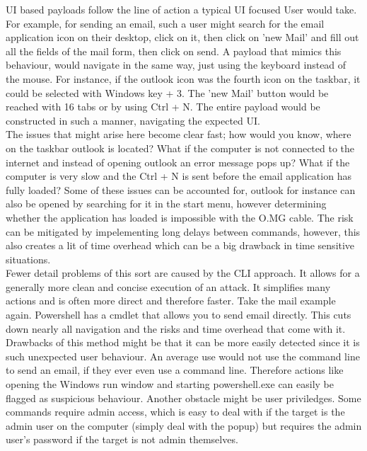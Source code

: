 UI based payloads follow the line of action a typical UI focused User would take. For example, for sending an email, such a user might search for the email application icon on their desktop, click on it, then click on 'new Mail' and fill out all the fields of the mail form, then click on send. A payload that mimics this behaviour, would navigate in the same way, just using the keyboard instead of the mouse. For instance, if the outlook icon was the fourth icon on the taskbar, it could be selected with Windows key + 3. The 'new Mail' button would be reached with 16 tabs or by using  Ctrl + N. The entire payload would be constructed in such a manner, navigating the expected UI. \\
The issues that might arise here become clear fast; how would you know, where on the taskbar outlook is located? What if the computer is not connected to the internet and instead of opening outlook an error message pops up? What if the computer is very slow and the Ctrl + N is sent before the email application has fully loaded?  Some of these issues can be accounted for, outlook for instance can also be opened by searching for it in the start menu, however determining whether the application has loaded is impossible with the O.MG cable. The risk can be mitigated by impelementing long delays between commands, however, this also creates a lit of time overhead which can be a big drawback in time sensitive situations. \\

Fewer detail problems of this sort are caused by the CLI approach. It allows for a generally more clean and concise execution of an attack. It simplifies many actions and is often more direct and therefore faster. Take the mail example again. Powershell has a cmdlet that allows you to send email directly. This cuts down nearly all navigation and the risks and time overhead that come with it. \\
Drawbacks of this method might be that it can be more easily detected since it is such unexpected user behaviour. An average use would not use the command line to send an email, if they ever even use a command line. Therefore actions like opening the Windows run window and starting powershell.exe can easily be flagged as suspicious behaviour. Another obstacle might be user priviledges. Some commands require admin access, which is easy to deal with if the target is the admin user on the computer (simply deal with the popup) but requires the admin user's password if the target is not admin themselves. 



